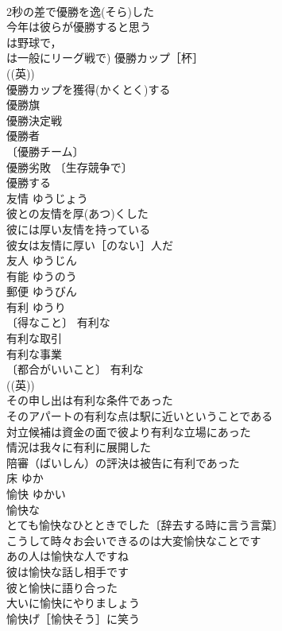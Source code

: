 \documentclass[8pt]{extreport}
\begin{document}
\begin{CJK}{UTF8}{min}
\\	2秒の差で優勝を逸(そら)した 
\\	今年は彼らが優勝すると思う 
\\	は野球で，
\\	は一般にリーグ戦で) 優勝カップ［杯］ 
\\	((英)) 
\\	優勝カップを獲得(かくとく)する 
\\	優勝旗 
\\	優勝決定戦 
\\	優勝者 
\\	〔優勝チーム〕
\\	優勝劣敗 〔生存競争で〕
\\	優勝する 
\\	友情	ゆうじょう	
\\	彼との友情を厚(あつ)くした 
\\	彼には厚い友情を持っている 
\\	彼女は友情に厚い［のない］人だ 
\\	友人	ゆうじん	
\\	有能	ゆうのう	
\\	郵便	ゆうびん	
\\	有利	ゆうり	
\\	〔得なこと〕 有利な 
\\	有利な取引 
\\	有利な事業 
\\	〔都合がいいこと〕 有利な 
\\	((英)) 
\\	その申し出は有利な条件であった 
\\	そのアパートの有利な点は駅に近いということである 
\\	対立候補は資金の面で彼より有利な立場にあった 
\\	情況は我々に有利に展開した 
\\	陪審（ばいしん）の評決は被告に有利であった 
\\	床	ゆか	
\\	愉快	ゆかい	
\\	愉快な 
\\	とても愉快なひとときでした〔辞去する時に言う言葉〕 
\\	こうして時々お会いできるのは大変愉快なことです 
\\	あの人は愉快な人ですね 
\\	彼は愉快な話し相手です 
\\	彼と愉快に語り合った 
\\	大いに愉快にやりましょう 
\\	愉快げ［愉快そう］に笑う 

\end{CJK}
\end{document}
